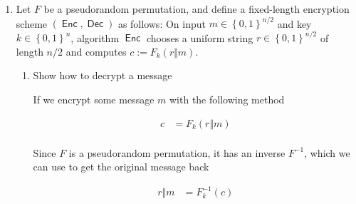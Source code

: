 \documentclass{article}
\DeclareMathOperator{\negl}{\textsf{negl}}
\DeclareMathOperator{\Enc}{\textsf{Enc}}
\DeclareMathOperator{\Dec}{\textsf{Dec}}
\begin{document}
\begin{enumerate}
\begin{proof}
      Due to the chosen-plaintext attack, we know that the adversary observes
      the same view of the encryption whether it is pseudorandom or unifom, i.e.
      there exists a function such that
      \[
        \left| \Pr \left[D^{F_k(\cdot)}(1^n) = 1\right] - \Pr
        \left[D^{f(\cdot)}(1^n) =
        0\right] \right| \leq \negl(n)
      \]

      However, since the distinguisher $D$ can determine a pseudorandom function
      with probability $1$, and will happen to guess the correct function $f$
      out of all the $2^n$ $n$-bit strings with a probability of $\frac{1}{2^n}$ 
      we instead find that

      \begin{align*}
        \left| \Pr \left[D^{F_k(\cdot)}(1^n) = 1\right] - \Pr
        \left[D^{f(\cdot)}(1^n) =
        0\right] \right| &\leq \negl(n)\\
        1 - \frac{1}{2^n} &\not\leq \negl(n).
      \end{align*}

      Therefore, since no such attacker can exist, no such definition can be made.
    \end{proof}

  \item Let $F$ be a pseudorandom permutation, and define a fixed-length
    encryption scheme $(\Enc, \Dec)$ as follows: On input $m \in
    \left\{0, 1\right\}^{n / 2}$ and key $k \in \left\{0, 1\right\}^n$,
    algorithm $\Enc$ chooses a uniform string $r \in \left\{0,
    1\right\}^{n/2}$ of length $n/2$ and computes $c := F_k(r \Vert m)$.

    \begin{enumerate}
      \item Show how to decrypt a message

        If we encrypt some message $m$ with the following method

        \begin{align*}
          c &= F_k(r \Vert m)\\
        \end{align*}

        Since $F$ is a pseudorandom permutation, it has an inverse $F^{-1}$, which
        we can use to get the original message back

        \begin{align*}
          r \Vert m &= F^{-1}_k(c)\\
        \end{align*}


\end{enumerate}
\end{enumerate}
\end{document}
